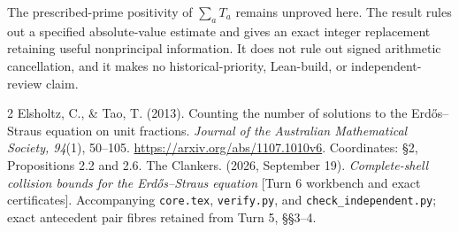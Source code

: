 \documentclass[10pt,reqno]{amsart}
\begin{document}
The prescribed-prime positivity of $\sum_aT_a$ remains unproved here. The
result rules out a specified absolute-value estimate and gives an exact
integer replacement retaining useful nonprincipal information. It does not
rule out signed arithmetic cancellation, and it makes no historical-priority,
Lean-build, or independent-review claim.

\begin{thebibliography}{2}
 Elsholtz, C., \& Tao, T. (2013).
Counting the number of solutions to the Erd\H{o}s--Straus equation on unit fractions.
\emph{Journal of the Australian Mathematical Society, 94}(1), 50--105.
\url{https://arxiv.org/abs/1107.1010v6}. Coordinates: \S2, Propositions 2.2 and 2.6.
 The Clankers. (2026, September 19).
\emph{Complete-shell collision bounds for the Erd\H{o}s--Straus equation}
[Turn 6 workbench and exact certificates]. Accompanying \texttt{core.tex},
\texttt{verify.py}, and \texttt{check\_independent.py}; exact antecedent pair
fibres retained from Turn 5, \S\S3--4.
\end{thebibliography}
\end{document}
